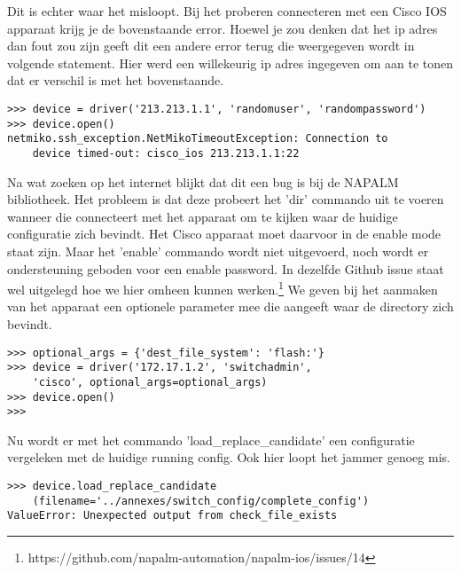 Dit is echter waar het misloopt. Bij het proberen connecteren met een Cisco IOS apparaat krijg je de bovenstaande error.
Hoewel je zou denken dat het ip adres dan fout zou zijn geeft dit een andere error terug die weergegeven wordt in volgende statement. Hier werd een willekeurig ip adres ingegeven om aan te tonen dat er verschil is met het bovenstaande.

\begin{center}
\begin{Verbatim}
>>> device = driver('213.213.1.1', 'randomuser', 'randompassword')
>>> device.open()
netmiko.ssh_exception.NetMikoTimeoutException: Connection to 
    device timed-out: cisco_ios 213.213.1.1:22
\end{Verbatim}
\end{center}

Na wat zoeken op het internet blijkt dat dit een bug is bij de NAPALM bibliotheek. Het probleem is dat deze probeert het 'dir' commando uit te voeren wanneer die connecteert met het apparaat om te kijken waar de huidige configuratie zich bevindt. Het Cisco apparaat moet daarvoor in de enable mode staat zijn. Maar het 'enable' commando wordt niet uitgevoerd, noch wordt er ondersteuning geboden voor een enable password. In dezelfde Github issue staat wel uitgelegd hoe we hier omheen kunnen werken.\footnote{https://github.com/napalm-automation/napalm-ios/issues/14} We geven bij het aanmaken van het apparaat een optionele parameter mee die aangeeft waar de directory zich bevindt.\autocite{napalmSupport}

\begin{center}
\begin{Verbatim}
>>> optional_args = {'dest_file_system': 'flash:'}
>>> device = driver('172.17.1.2', 'switchadmin', 
    'cisco', optional_args=optional_args)
>>> device.open()
>>>
\end{Verbatim}
\end{center}

Nu wordt er met het commando 'load\_replace\_candidate' een configuratie vergeleken met de huidige running config.
Ook hier loopt het jammer genoeg mis. 

\begin{center}
\begin{BVerbatim}
>>> device.load_replace_candidate
    (filename='../annexes/switch_config/complete_config')
ValueError: Unexpected output from check_file_exists
\end{BVerbatim}
\end{center}

